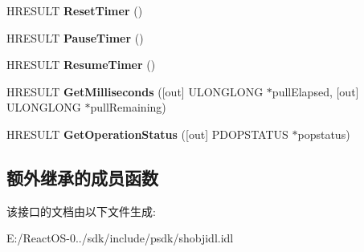 \begin{DoxyCompactItemize}
\item 
\mbox{\label{interface_i_operations_progress_dialog_ab976532ec7cc75e5a4210aed14b04dae}} 
H\+R\+E\+S\+U\+LT {\bfseries Reset\+Timer} ()
\item 
\mbox{\label{interface_i_operations_progress_dialog_a84774938ab550b35674c5ee9a0472978}} 
H\+R\+E\+S\+U\+LT {\bfseries Pause\+Timer} ()
\item 
\mbox{\label{interface_i_operations_progress_dialog_a5b2de4a38e4607e7af493aa7b6b96acb}} 
H\+R\+E\+S\+U\+LT {\bfseries Resume\+Timer} ()
\item 
\mbox{\label{interface_i_operations_progress_dialog_a185aeda888eb5d0f698fa6909b6b0c79}} 
H\+R\+E\+S\+U\+LT {\bfseries Get\+Milliseconds} (\mbox{[}out\mbox{]} U\+L\+O\+N\+G\+L\+O\+NG $\ast$pull\+Elapsed, \mbox{[}out\mbox{]} U\+L\+O\+N\+G\+L\+O\+NG $\ast$pull\+Remaining)
\item 
\mbox{\label{interface_i_operations_progress_dialog_a9b8ab34cf44fdfda6e5867a6ecba94ba}} 
H\+R\+E\+S\+U\+LT {\bfseries Get\+Operation\+Status} (\mbox{[}out\mbox{]} P\+D\+O\+P\+S\+T\+A\+T\+US $\ast$popstatus)
\end{DoxyCompactItemize}
\subsection*{额外继承的成员函数}


该接口的文档由以下文件生成\+:\begin{DoxyCompactItemize}
\item 
E\+:/\+React\+O\+S-\/0../sdk/include/psdk/shobjidl.\+idl\end{DoxyCompactItemize}
